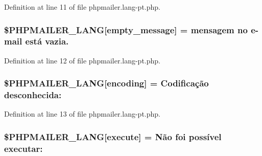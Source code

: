 Definition at line 11 of file phpmailer.\+lang-\/pt.\+php.

\subsubsection[{\texorpdfstring{\$\+P\+H\+P\+M\+A\+I\+L\+E\+R\+\_\+\+L\+A\+NG}{$PHPMAILER_LANG}}]{\setlength{\rightskip}{0pt plus 5cm}\$P\+H\+P\+M\+A\+I\+L\+E\+R\+\_\+\+L\+A\+NG\mbox{[}\textquotesingle{}empty\+\_\+message\textquotesingle{}\mbox{]} =  mensagem no {\bf e}-\/mail está vazia.\textquotesingle{}}\hypertarget{phpmailer_8lang-pt_8php_a33772099f637c9d6c2cd7425e0e37fed}{}\label{phpmailer_8lang-pt_8php_a33772099f637c9d6c2cd7425e0e37fed}


Definition at line 12 of file phpmailer.\+lang-\/pt.\+php.

\subsubsection[{\texorpdfstring{\$\+P\+H\+P\+M\+A\+I\+L\+E\+R\+\_\+\+L\+A\+NG}{$PHPMAILER_LANG}}]{\setlength{\rightskip}{0pt plus 5cm}\$P\+H\+P\+M\+A\+I\+L\+E\+R\+\_\+\+L\+A\+NG\mbox{[}\textquotesingle{}encoding\textquotesingle{}\mbox{]} = \textquotesingle{}Codificação desconhecida\+: \textquotesingle{}}\hypertarget{phpmailer_8lang-pt_8php_a817f7283f3d54c970a0c10305cc668cc}{}\label{phpmailer_8lang-pt_8php_a817f7283f3d54c970a0c10305cc668cc}


Definition at line 13 of file phpmailer.\+lang-\/pt.\+php.

\subsubsection[{\texorpdfstring{\$\+P\+H\+P\+M\+A\+I\+L\+E\+R\+\_\+\+L\+A\+NG}{$PHPMAILER_LANG}}]{\setlength{\rightskip}{0pt plus 5cm}\$P\+H\+P\+M\+A\+I\+L\+E\+R\+\_\+\+L\+A\+NG\mbox{[}\textquotesingle{}execute\textquotesingle{}\mbox{]} = \textquotesingle{}Não foi possível executar\+: \textquotesingle{}}\hypertarget{phpmailer_8lang-pt_8php_a668217a9563a168f30f2a8548b6ed5a9}{}\label{phpmailer_8lang-pt_8php_a668217a9563a168f30f2a8548b6ed5a9}


